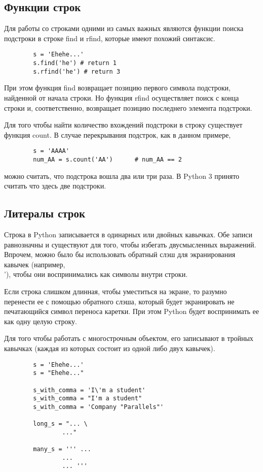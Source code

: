 \documentclass[a4paper, fleqn]{article}
\begin{document}
	\subsection*{Функции строк}
	
	Для работы со строками  одними из самых важных являются функции поиска подстроки в строке find и rfind, которые имеют похожий синтаксис. 
	\begin{lstlisting}
		s = 'Ehehe...'
		s.find('he') # return 1
		s.rfind('he') # return 3
	\end{lstlisting}
	
	При этом функция find возвращает позицию первого символа подстроки, найденной от начала строки. Но функция rfind осуществляет поиск с конца строки и, соответственно, возвращает  позицию последнего элемента подстроки.
	
	Для того чтобы найти количество вхождений подстроки в строку существует функция count. 
	В случае перекрывания подстрок, как в данном примере, 
	\begin{lstlisting}
		s = 'AAAA'
		num_AA = s.count('AA')		# num_AA == 2
	\end{lstlisting} 
	можно считать, что подстрока вошла два или три раза. В Python 3 принято считать что здесь две подстроки. 
	
	\subsection*{Литералы строк}
	
	Строка в Python записывается в одинарных или двойных кавычках. Обе записи равнозначны и существуют для того, чтобы избегать двусмысленных выражений. Впрочем, можно было бы использовать обратный слэш для экранирования кавычек (например, \\'), чтобы они воспринимались как символы внутри строки. 
	
	Если строка слишком длинная, чтобы уместиться на экране, то разумно перенести ее с помощью обратного слэша, который будет экранировать не печатающийся символ переноса каретки. При этом Python будет воспринимать ее как одну целую строку.
	
	Для того чтобы работать с многострочным объектом, его записывают в тройных кавычках (каждая из которых состоит из одной либо двух кавычек). 
	\begin{lstlisting}
		s = 'Ehehe...'
		s = "Ehehe..."
		
		s_with_comma = 'I\'m a student'
		s_with_comma = "I'm a student"
		s_with_comma = 'Company "Parallels"'
		
		long_s = "... \
				..."
		
		many_s = ''' ...
				...
				... '''		
	\end{lstlisting}
	
\end{document}
